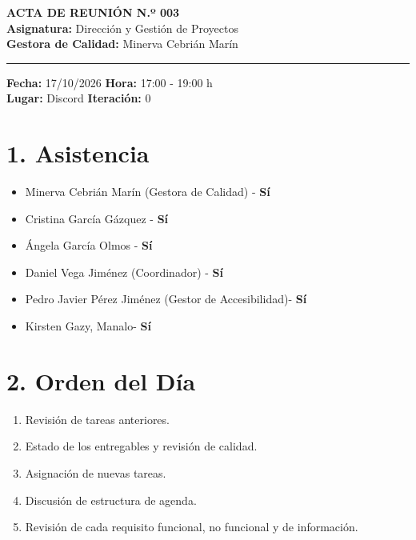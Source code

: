 
\begin{center}
    {\Large \textbf{ACTA DE REUNIÓN N.º 003}}\\[0.2cm]
    \textbf{Asignatura:} Dirección y Gestión de Proyectos\\
    \textbf{Gestora de Calidad:} Minerva Cebrián Marín
\end{center}

\vspace{0.3cm}
\hrule
\vspace{0.4cm}

\noindent \textbf{Fecha:} 17/10/2026 \hfill \textbf{Hora:} 17:00 - 19:00 h\\
\noindent \textbf{Lugar:} Discord  \hfill \textbf{Iteración:} 0

\vspace{0.4cm}

\section*{1. Asistencia}
\begin{itemize}
    \item Minerva Cebrián Marín (Gestora de Calidad) - \textbf{Sí}
    \item Cristina García Gázquez  - \textbf{Sí}
    \item Ángela García Olmos  - \textbf{Sí}
    \item Daniel Vega Jiménez (Coordinador) - \textbf{Sí}
    \item Pedro Javier Pérez Jiménez (Gestor de Accesibilidad)- \textbf{Sí}
    \item Kirsten Gazy, Manalo- \textbf{Sí}

\end{itemize}



\section*{2. Orden del Día}
\begin{enumerate}
    \item Revisión de tareas anteriores.
    \item Estado de los entregables y revisión de calidad.
    \item Asignación de nuevas tareas.
    \item Discusión de estructura de agenda.
    \item Revisión de cada requisito funcional, no funcional y de información.
\end{enumerate}

